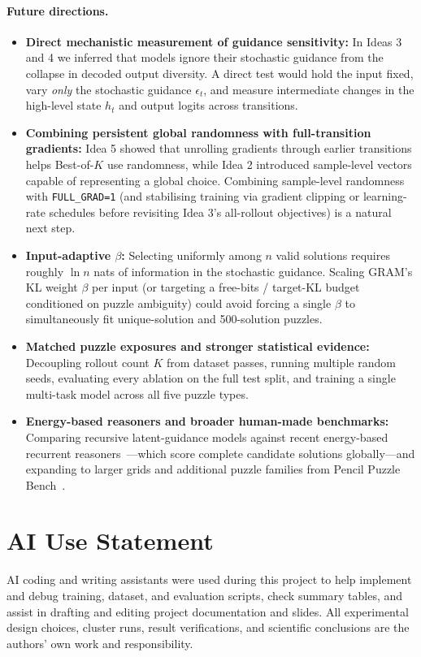 \documentclass[11pt]{article}
\newcommand{\Bok}{Best-of-$K$}
\begin{document}
\paragraph{Future directions.}
\begin{itemize}
  \item \textbf{Direct mechanistic measurement of guidance sensitivity:} In Ideas 3 and 4 we inferred that models ignore their stochastic guidance from the collapse in decoded output diversity. A direct test would hold the input fixed, vary \emph{only} the stochastic guidance $\epsilon_t$, and measure intermediate changes in the high-level state $h_t$ and output logits across transitions.
  \item \textbf{Combining persistent global randomness with full-transition gradients:} Idea 5 showed that unrolling gradients through earlier transitions helps \Bok{} use randomness, while Idea 2 introduced sample-level vectors capable of representing a global choice. Combining sample-level randomness with \texttt{FULL\_GRAD=1} (and stabilising training via gradient clipping or learning-rate schedules before revisiting Idea 3's all-rollout objectives) is a natural next step.
  \item \textbf{Input-adaptive $\beta$:} Selecting uniformly among $n$ valid solutions requires roughly $\ln n$ nats of information in the stochastic guidance. Scaling GRAM's KL weight $\beta$ per input (or targeting a free-bits / target-KL budget conditioned on puzzle ambiguity) could avoid forcing a single $\beta$ to simultaneously fit unique-solution and 500-solution puzzles.
  \item \textbf{Matched puzzle exposures and stronger statistical evidence:} Decoupling rollout count $K$ from dataset passes, running multiple random seeds, evaluating every ablation on the full test split, and training a single multi-task model across all five puzzle types.
  \item \textbf{Energy-based reasoners and broader human-made benchmarks:} Comparing recursive latent-guidance models against recent energy-based recurrent reasoners~\cite{chen2026,hoover2026}---which score complete candidate solutions globally---and expanding to larger grids and additional puzzle families from Pencil Puzzle Bench~\cite{waugh2026}.
\end{itemize}

\section*{AI Use Statement}
AI coding and writing assistants were used during this project to help implement and debug training, dataset, and evaluation scripts, check summary tables, and assist in drafting and editing project documentation and slides. All experimental design choices, cluster runs, result verifications, and scientific conclusions are the authors' own work and responsibility.
\end{document}
